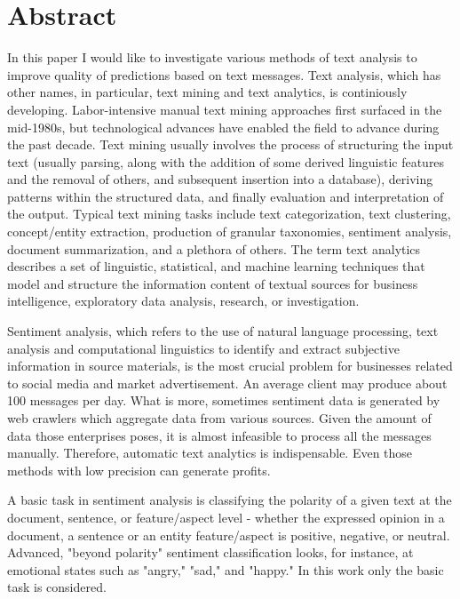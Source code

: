\documentclass[12pt]{report}
\begin{document}
\renewcommand{\bibname}{References}
\setcounter{tocdepth}{1}

\setcounter{page}{2}

\large

\thispagestyle{empty}
\tableofcontents

\chapter*{Abstract}

In this paper I would like to investigate various methods of text analysis to improve quality of predictions based on text messages.
Text analysis, which has other names, in particular, text mining and text analytics, is continiously developing. Labor-intensive manual text mining approaches first surfaced in the mid-1980s, but technological advances have enabled the field to advance during the past decade. Text mining usually involves the process of structuring the input text (usually parsing, along with the addition of some derived linguistic features and the removal of others, and subsequent insertion into a database), deriving patterns within the structured data, and finally evaluation and interpretation of the output. Typical text mining tasks include text categorization, text clustering, concept/entity extraction, production of granular taxonomies, sentiment analysis, document summarization, and a plethora of others.
The term text analytics describes a set of linguistic, statistical, and machine learning techniques that model and structure the information content of textual sources for business intelligence, exploratory data analysis, research, or investigation.

Sentiment analysis, which refers to the use of natural language processing, text analysis and computational linguistics to identify and extract subjective information in source materials, is the most crucial problem for businesses related to social media and market advertisement. An average client may produce about 100 messages per day. What is more, sometimes sentiment data is generated by web crawlers which aggregate data from various sources. Given the amount of data those enterprises poses, it is almost infeasible to process all the messages manually. Therefore, automatic text analytics is indispensable. Even those methods with low precision can generate profits.

A basic task in sentiment analysis is classifying the polarity of a given text at the document, sentence, or feature/aspect level - whether the expressed opinion in a document, a sentence or an entity feature/aspect is positive, negative, or neutral. Advanced, "beyond polarity" sentiment classification looks, for instance, at emotional states such as "angry," "sad," and "happy." In this work only the basic task is considered.
\end{document}
